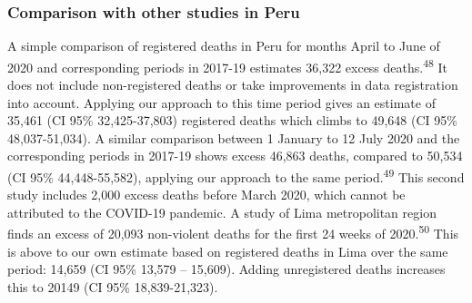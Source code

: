 \documentclass[
]{article}
\begin{document}
\hypertarget{comparison-with-other-studies-in-peru}{%
\subsubsection{Comparison with other studies in Peru}\label{comparison-with-other-studies-in-peru}}

A simple comparison of registered deaths in Peru for months April to June of 2020 and corresponding periods in 2017-19 estimates 36,322 excess deaths.\textsuperscript{48} It does not include non-registered deaths or take improvements in data registration into account. Applying our approach to this time period gives an estimate of 35,461 (CI 95\% 32,425-37,803) registered deaths which climbs to 49,648 (CI 95\% 48,037-51,034). A similar comparison between 1 January to 12 July 2020 and the corresponding periods in 2017-19 shows excess 46,863 deaths, compared to 50,534 (CI 95\% 44,448-55,582), applying our approach to the same period.\textsuperscript{49} This second study includes 2,000 excess deaths before March 2020, which cannot be attributed to the COVID-19 pandemic. A study of Lima metropolitan region finds an excess of 20,093 non-violent deaths for the first 24 weeks of 2020.\textsuperscript{50} This is above to our own estimate based on registered deaths in Lima over the same period: 14,659 (CI 95\% 13,579 -- 15,609). Adding unregistered deaths increases this to 20149 (CI 95\% 18,839-21,323).
\end{document}
